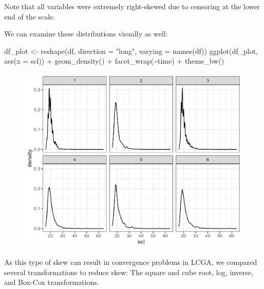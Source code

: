 \documentclass[
  man,floatsintext]{apa6}
\newenvironment{Shaded}{\begin{snugshade}}{\end{snugshade}}
\newcommand{\AttributeTok}[1]{\textcolor[rgb]{0.77,0.63,0.00}{#1}}
\newcommand{\FunctionTok}[1]{\textcolor[rgb]{0.00,0.00,0.00}{#1}}
\newcommand{\NormalTok}[1]{#1}
\newcommand{\OtherTok}[1]{\textcolor[rgb]{0.56,0.35,0.01}{#1}}
\newcommand{\SpecialCharTok}[1]{\textcolor[rgb]{0.00,0.00,0.00}{#1}}
\newcommand{\StringTok}[1]{\textcolor[rgb]{0.31,0.60,0.02}{#1}}
\begin{document}
Note that all variables were extremely right-skewed due to censoring at
the lower end of the scale.

We can examine these distributions visually as well:

\begin{Shaded}
\begin{Highlighting}[]
\NormalTok{df\_plot }\OtherTok{\textless{}{-}} \FunctionTok{reshape}\NormalTok{(df, }\AttributeTok{direction =} \StringTok{"long"}\NormalTok{, }\AttributeTok{varying =} \FunctionTok{names}\NormalTok{(df))}
\FunctionTok{ggplot}\NormalTok{(df\_plot, }\FunctionTok{aes}\NormalTok{(}\AttributeTok{x =}\NormalTok{ scl)) }\SpecialCharTok{+}
  \FunctionTok{geom\_density}\NormalTok{() }\SpecialCharTok{+}
  \FunctionTok{facet\_wrap}\NormalTok{(}\SpecialCharTok{\textasciitilde{}}\NormalTok{time) }\SpecialCharTok{+} \FunctionTok{theme\_bw}\NormalTok{()}
\end{Highlighting}
\end{Shaded}

\begin{figure}
\includegraphics[width=0.5\linewidth]{appendices/plot_dist} \caption{ }\label{fig:unnamed-chunk-5}
\end{figure}

As this type of skew can result in convergence problems in LCGA, we
compared several transformations to reduce skew: The square and cube
root, log, inverse, and Box-Cox transformations.
\end{document}
